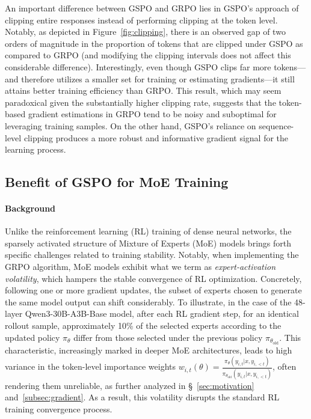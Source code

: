 An important difference between GSPO and GRPO lies in GSPO’s approach of clipping entire responses instead of performing clipping at the token level. Notably, as depicted in Figure~\ref{fig:clipping}, there is an observed gap of two orders of magnitude in the proportion of tokens that are clipped under GSPO as compared to GRPO (and modifying the clipping intervals does not affect this considerable difference). Interestingly, even though GSPO clips far more tokens—and therefore utilizes a smaller set for training or estimating gradients—it still attains better training efficiency than GRPO. This result, which may seem paradoxical given the substantially higher clipping rate, suggests that the token-based gradient estimations in GRPO tend to be noisy and suboptimal for leveraging training samples. On the other hand, GSPO’s reliance on sequence-level clipping produces a more robust and informative gradient signal for the learning process.

\subsection{Benefit of GSPO for MoE Training}
\label{subsec:routing_replay}

\paragraph{Background}
Unlike the reinforcement learning (RL) training of dense neural networks, the sparsely activated structure of Mixture of Experts (MoE) models brings forth specific challenges related to training stability. Notably, when implementing the GRPO algorithm, MoE models exhibit what we term as \textit{expert-activation volatility}, which hampers the stable convergence of RL optimization. Concretely, following one or more gradient updates, the subset of experts chosen to generate the same model output can shift considerably. To illustrate, in the case of the 48-layer Qwen3-30B-A3B-Base model, after each RL gradient step, for an identical rollout sample, approximately 10\% of the selected experts according to the updated policy $\pi_{\theta}$ differ from those selected under the previous policy $\pi_{\theta_\text{old}}$.
This characteristic, increasingly marked in deeper MoE architectures, leads to high variance in the token-level importance weights $w_{i,t}(\theta) = \frac{ \pi_{\theta} (y_{i,t} | x, y_{i,<t}) }{ \pi_{\theta_\text{old}} (y_{i,t} | x,y_{i,<t})}$, often rendering them unreliable, as further analyzed in \S~\ref{sec:motivation} and~\ref{subsec:gradient}. As a result, this volatility disrupts the standard RL training convergence process.

